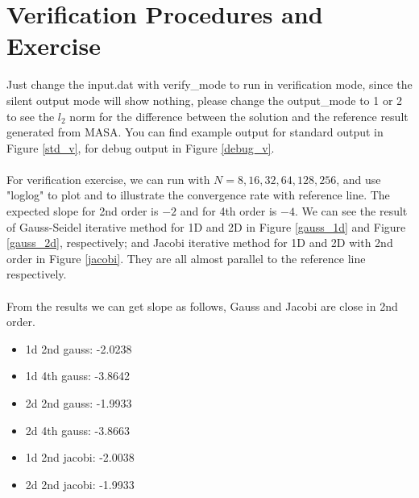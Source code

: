 \documentclass[a4paper]{article}
\begin{document}
\section{Verification Procedures and Exercise}
Just change the input.dat with verify\_mode to run in verification mode, since the silent output mode will show nothing, please change the output\_mode to 1 or 2 to see the $l_2$ norm for the difference between the solution and the reference result generated from MASA. You can find example output for standard output in Figure \ref{std_v}, for debug output in Figure \ref{debug_v}.\\\\
For verification exercise, we can run with $N= 8, 16, 32, 64, 128, 256$, and use "loglog" to plot and to illustrate the convergence rate with reference line. The expected slope for 2nd order is $-2$ and for 4th order is $-4$. We can see the result of Gauss-Seidel iterative method for 1D and 2D in Figure \ref{gauss_1d} and Figure \ref{gauss_2d}, respectively; and Jacobi iterative method for 1D and 2D with 2nd order in Figure \ref{jacobi}. They are all almost parallel to the reference line respectively.\\\\
From the results we can get slope as follows, Gauss and Jacobi are close in 2nd order.\\
\begin{itemize}
    \item 1d 2nd gauss:  -2.0238
    \item 1d 4th gauss:  -3.8642
    \item 2d 2nd gauss:  -1.9933
    \item 2d 4th gauss:  -3.8663
    \item 1d 2nd jacobi: -2.0038
    \item 2d 2nd jacobi: -1.9933
\end{itemize}
\end{document}
